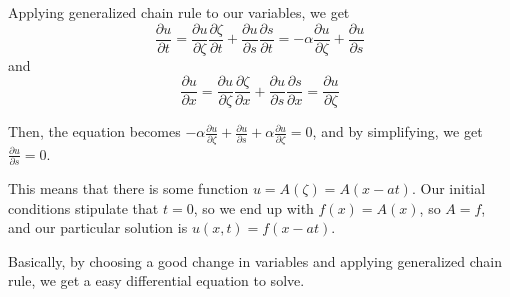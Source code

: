 \documentclass{article}
\begin{document}
Applying generalized chain rule to our variables, we get $$\frac{\partial u}{\partial t} = \frac{\partial u}{\partial \zeta} \frac{\partial \zeta}{\partial t} + \frac{\partial u}{\partial s}\frac{\partial s}{\partial t} = -\alpha\frac{\partial u}{\partial \zeta} + \frac{\partial u}{\partial s}$$
and$$\frac{\partial u}{\partial x} = \frac{\partial u}{\partial \zeta} \frac{\partial \zeta}{\partial x} + \frac{\partial u}{\partial s} \frac{\partial s}  {\partial x} = \frac{\partial u}{\partial \zeta}$$

Then, the equation becomes $-\alpha\frac{\partial u}{\partial \zeta} + \frac{\partial u}{\partial s} + \alpha \frac{\partial u}{\partial \zeta} = 0$, and by simplifying, we get $\frac{\partial u}{\partial s} = 0$. 

This means that there is some function $u = A(\zeta) = A(x-at)$. Our initial conditions stipulate that $t = 0$, so we end up with $f(x) = A(x)$, so $A = f$, and our particular solution is $u(x,t) = f(x-at)$.

Basically, by choosing a good change in variables and applying generalized chain rule, we get a easy differential equation to solve. 
\end{document}
